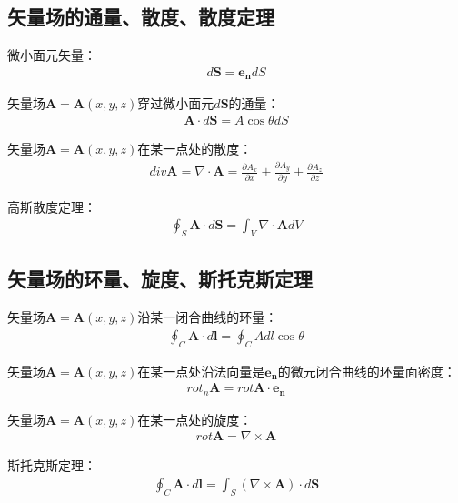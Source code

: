 \documentclass[withoutpreface,bwprint]{cumcmthesis} %
\begin{document}
\subsection{矢量场的通量、散度、散度定理}

微小面元矢量：
\begin{align}
    d \boldsymbol{S} = \boldsymbol{e_n} dS
\end{align}

矢量场$\boldsymbol{A} = \boldsymbol{A}(x, y, z)$穿过微小面元$d \boldsymbol{S}$的通量：
\begin{align}
    \boldsymbol{A} \cdot d \boldsymbol{S} = A \cos \theta dS
\end{align}

矢量场$\boldsymbol{A} = \boldsymbol{A}(x, y, z)$在某一点处的散度：
\begin{align}
    div \boldsymbol{A} = \nabla \cdot \boldsymbol{A} = \frac{\partial A_x}{\partial x} + \frac{\partial A_y}{\partial y} + \frac{\partial A_z}{\partial z}
\end{align}

高斯散度定理：
\begin{align}
\oint_S \boldsymbol{A} \cdot d \boldsymbol{S} = \int_V \nabla \cdot \boldsymbol{A} dV
\end{align}

\subsection{矢量场的环量、旋度、斯托克斯定理}

矢量场$\boldsymbol{A} = \boldsymbol{A}(x, y, z)$沿某一闭合曲线的环量：
\begin{align}
    \oint_C \boldsymbol{A} \cdot d\boldsymbol{l} = \oint_C A dl \cos \theta
\end{align}

矢量场$\boldsymbol{A} = \boldsymbol{A}(x, y, z)$在某一点处沿法向量是$\boldsymbol{e_n}$的微元闭合曲线的环量面密度：
\begin{align}
    rot_n \boldsymbol{A} = rot \boldsymbol{A} \cdot \boldsymbol{e_n}
\end{align}

矢量场$\boldsymbol{A} = \boldsymbol{A}(x, y, z)$在某一点处的旋度：
\begin{align}
    rot \boldsymbol{A} = \nabla \times \boldsymbol{A}
\end{align}

斯托克斯定理：
\begin{align}
    \oint_C \boldsymbol{A} \cdot d\boldsymbol{l} = \int_S (\nabla \times \boldsymbol{A})\cdot d\boldsymbol{S}
\end{align}
\end{document}
